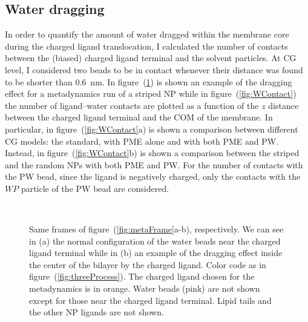 \subsection{Water dragging}
\label{sec:WDragging}
In order to quantify the amount of water dragged within the membrane core during the charged ligand translocation, I calculated the number of contacts between the (biased) charged ligand terminal and the solvent particles. At \ac{CG} level, I considered two beads to be in contact whenever their distance was found to be shorter than $0.6$~nm. In figure~(\ref{fig:PWDragging}) is shown an example of the dragging effect for a metadynamics run of a striped \ac{NP} while in figure~(\ref{fig:WContact}) the number of ligand--water contacts are plotted as a function of the $z$ distance between the charged ligand terminal and the \ac{COM} of the membrane. In particular, in figure~(\ref{fig:WContact}a) is shown a comparison between different \ac{CG} \martini models: the standard, with \ac{PME} alone and with both \ac{PME} and \ac{PW}. Instead, in figure~(\ref{fig:WContact}b) is shown a comparison between the striped and the random \acp{NP} with both \ac{PME} and \ac{PW}. For the number of contacts with the \ac{PW} bead, since the ligand is negatively charged, only the contacts with the $WP$ particle of the \ac{PW} bead are considered.
\begin{figure}[!ht]
	\center
	\ %
	\caption{Same frames of figure~(\ref{fig:metaFrame}a-b), respectively. We can see in (a) the normal configuration of the water beads near the charged ligand terminal while in (b) an example of the dragging effect inside the center of the bilayer by the charged ligand. Color code as in figure~(\ref{fig:threeProcess}). The charged ligand chosen for the metadynamics is in orange. Water beads (pink) are not shown except for those near the charged ligand terminal. Lipid tails and the other \acs{NP} ligands are not shown.}%
	\label{fig:PWDragging}
\end{figure}
